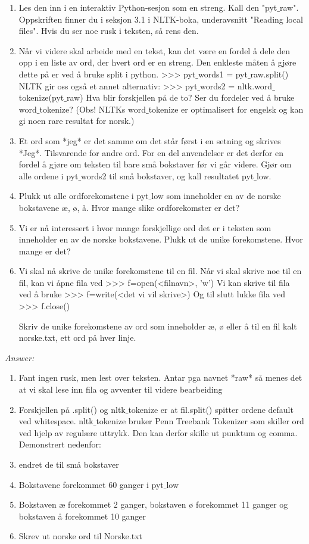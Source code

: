 \documentclass[a4paper, 12pt,]{article}             %
\begin{document}
\begin{enumerate}
\item  Les den inn i en interaktiv Python-sesjon som en streng. Kall den "pyt$\_$raw". Oppskriften finner du i 
seksjon 3.1 i NLTK-boka, underavsnitt "Reading local files". Hvis du ser noe rusk i teksten, så rens den. 
\item Når vi videre skal arbeide med en tekst, kan det være en fordel å dele den opp i en liste av ord, der 
hvert ord er en streng. Den enkleste måten å gjøre dette på er ved å bruke split i python. 
>>> pyt$\_$words1 = pyt$\_$raw.split() 
NLTK gir oss også et annet alternativ: 
>>> pyt$\_$words2 = nltk.word$\_$tokenize(pyt$\_$raw) 
Hva blir forskjellen på de to? Ser du fordeler ved å bruke word$\_$tokenize? (Obs! NLTKs word$\_$tokenize 
er optimalisert for engelsk og kan gi noen rare resultat for norsk.) 
\item Et ord som *jeg* er det samme om det står først i en setning og skrives *Jeg*. Tilsvarende for andre 
ord. For en del anvendelser er det derfor en fordel å gjøre om teksten til bare små bokstaver før vi 
går videre. Gjør om alle ordene i pyt$\_$words2 til små bokstaver, og kall resultatet pyt$\_$low. 
\item Plukk ut alle ordforekomstene i pyt$\_$low som inneholder en av de norske bokstavene æ, ø, å. Hvor 
mange slike ordforekomster er det? 
\item  Vi er nå interessert i hvor mange forskjellige ord det er i teksten som inneholder en av de norske 
bokstavene. Plukk ut de unike forekomstene. Hvor mange er det? 
\item Vi skal nå skrive de unike forekomstene til en fil. Når vi skal skrive noe til en fil, kan vi åpne fila ved 
>>> f=open(<filnavn>, 'w') 
Vi kan skrive til fila ved å bruke 
>>> f=write(<det vi vil skrive>) 
Og til slutt lukke fila ved  
>>> f.close() 
 
Skriv de unike forekomstene av ord som inneholder æ, ø eller å til en fil kalt norske.txt, ett ord på 
hver linje.
\end{enumerate}

\textit{Answer:}

\begin{enumerate}
\item Fant ingen rusk, men lest over teksten. Antar pga navnet *raw* så menes det at vi skal lese inn fila og avventer til videre bearbeiding
\item Forskjellen på .split() og nltk$\_$tokenize er at fil.split() spitter ordene default ved whitespace. nltk$\_$tokenize bruker Penn Treebank Tokenizer som skiller ord ved hjelp av regulære uttrykk. Den kan derfor skille ut punktum og comma. Demonstrert nedenfor:
\item endret de til små bokstaver
\item Bokstavene forekommet 60 ganger i pyt$\_$low
\item Bokstaven æ forekommet 2 ganger, bokstaven ø forekommet 11 ganger og bokstaven å forekommet 10 ganger
\item Skrev ut norske ord til Norske.txt  
\end{enumerate}
\end{document}

